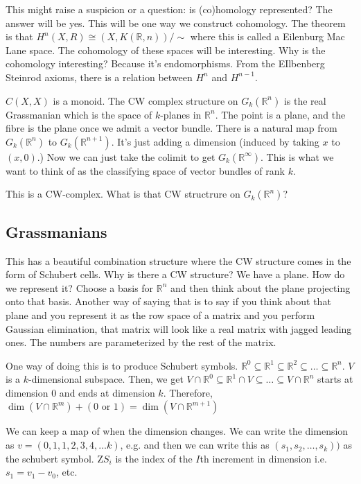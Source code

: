 \documentclass[10pt]{article}
\theoremstyle{definition}
\begin{document}
	This might raise a suspicion or a question: is (co)homology represented? The answer will be yes. This will be one way we construct cohomology. The theorem is that $H^n(X,R)\cong (X, K(\mathbb{R}, n))/\sim$ where this is called a Eilenburg Mac Lane space.  The cohomology of these spaces will be interesting. Why is the cohomology interesting? Because it's endomorphisms. From the EIlbenberg Steinrod axioms, there is a relation between $H^n$ and $H^{n-1}$. 
	
	$C(X,X)$ is a monoid. The CW complex structure on $G_k(\mathbb{R}^n)$ is the real Grassmanian which is the space of $k$-planes in $\mathbb{R}^n$.  The point is a plane, and the fibre is the plane once we admit a vector bundle. There is a natural map from $G_k(\mathbb{R}^n)$ to $G_k(\mathbb{R}^{n+1})$. It's just adding a dimension (induced by taking $x$ to $(x,0)$.) Now we can just take the colimit to get $G_k(\mathbb{R}^\infty)$. This is what we want to think of as the classifying space of vector bundles of rank $k$. 
	
	This is a CW-complex. What is that CW structrure on $G_k(\mathbb{R}^n)$?
	
	\subsection{Grassmanians}
	This has a beautiful combination structure where the CW structure comes in the form of Schubert cells. Why is there a CW structure? We have a plane. How do we represent it? Choose a basis for $\mathbb{R}^n$ and then think about the plane projecting onto that basis. Another way of saying that is to say if you think about that plane and you represent it as the row space of a matrix and you perform Gaussian elimination, that matrix will look like a real matrix with jagged leading ones. The numbers are parameterized by the rest of the matrix. 
	
	One way of doing this is to produce Schubert symbols. $\mathbb{R}^0\subseteq \mathbb{R}^1\subseteq \mathbb{R}^2\subseteq \dots \subseteq \mathbb{R}^n$.  $V$ is a $k$-dimensional subspace. Then, we get $V\cap \mathbb{R}^0\subseteq \mathbb{R}^1\cap V\subseteq \dots \subseteq V\cap \mathbb{R}^n$ starts at dimension $0$ and ends at dimension $k$. Therefore, $\dim(V\cap \mathbb{R}^m)+(0\text{ or }1)=\dim(V\cap \mathbb{R}^{m+1})$
	
	We can keep a map of when the dimension changes. We can write the dimension as $v=(0,1,1,2,3,4,\dots k)$, e.g. and then we can write this as $(s_1,s_2,\dots ,s_k))$ as the schubert symbol. Z$S_i$ is the index of the $I$th increment in dimension i.e. $s_1=v_1-v_0$, etc.
	
\end{document}
